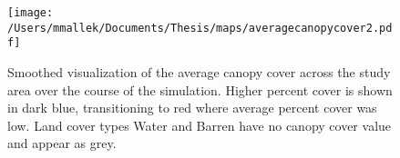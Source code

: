 \begin{figure}[!htbp]
\centering
\texttt{[image: /Users/mmallek/Documents/Thesis/maps/averagecanopycover2.pdf]}
\caption{Smoothed visualization of the average canopy cover across the study area over the course of the simulation. Higher percent cover is shown in dark blue, transitioning to red where average percent cover was low. Land cover types Water and Barren have no canopy cover value and appear as grey.}
\label{fig:averagecc}
\end{figure}


